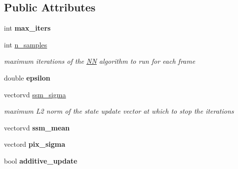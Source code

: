 \subsection*{Public Attributes}
\begin{DoxyCompactItemize}
\item 
\hypertarget{structmtf_1_1RegNetParams_aefa26512f683cc7660e9a812c6ecb057}{int {\bfseries max\-\_\-iters}}\label{structmtf_1_1RegNetParams_aefa26512f683cc7660e9a812c6ecb057}

\item 
\hypertarget{structmtf_1_1RegNetParams_a7f6b73f2e2d05deea9beed88ca59d7b1}{int \hyperlink{structmtf_1_1RegNetParams_a7f6b73f2e2d05deea9beed88ca59d7b1}{n\-\_\-samples}}\label{structmtf_1_1RegNetParams_a7f6b73f2e2d05deea9beed88ca59d7b1}

\begin{DoxyCompactList}\small\item\em maximum iterations of the \hyperlink{classNN}{N\-N} algorithm to run for each frame \end{DoxyCompactList}\item 
\hypertarget{structmtf_1_1RegNetParams_ad2657545e92ba4ea76240d59dc6bac99}{double {\bfseries epsilon}}\label{structmtf_1_1RegNetParams_ad2657545e92ba4ea76240d59dc6bac99}

\item 
\hypertarget{structmtf_1_1RegNetParams_aede2f345cd37055bfc28b915d1d758c7}{vectorvd \hyperlink{structmtf_1_1RegNetParams_aede2f345cd37055bfc28b915d1d758c7}{ssm\-\_\-sigma}}\label{structmtf_1_1RegNetParams_aede2f345cd37055bfc28b915d1d758c7}

\begin{DoxyCompactList}\small\item\em maximum L2 norm of the state update vector at which to stop the iterations \end{DoxyCompactList}\item 
\hypertarget{structmtf_1_1RegNetParams_a1d932644bb2291352627983c312668a1}{vectorvd {\bfseries ssm\-\_\-mean}}\label{structmtf_1_1RegNetParams_a1d932644bb2291352627983c312668a1}

\item 
\hypertarget{structmtf_1_1RegNetParams_af98f8751280f57ddbcf25f40087763f9}{vectord {\bfseries pix\-\_\-sigma}}\label{structmtf_1_1RegNetParams_af98f8751280f57ddbcf25f40087763f9}

\item 
\hypertarget{structmtf_1_1RegNetParams_afedbbd33d74b010fefa74c43bd16d4da}{bool {\bfseries additive\-\_\-update}}\label{structmtf_1_1RegNetParams_afedbbd33d74b010fefa74c43bd16d4da}


\end{DoxyCompactItemize}
